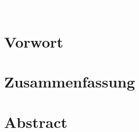 \textcolor{white}{Zitat}


\vfill
\begin{flushright}
\zitat
\end{flushright}
\newpage


\section*{Vorwort}
\vorwort

\newpage
\section*{Zusammenfassung}
\label{sec:Zusammenfassung}
\zusammenfassungDE


\vfill
\section*{Abstract}
\zusammenfassungEN





